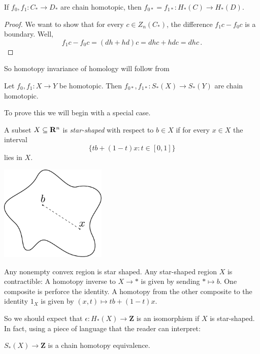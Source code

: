 \begin{lemma}
If $f_0,f_1:C_\ast\to D_\ast$ are chain homotopic, then 
$f_{0\ast}=f_{1\ast}: H_\ast(C)\to H_\ast(D)$.
	\end{lemma}
		\begin{proof}
We want to show that for every $c\in Z_n(C_\ast)$, the difference 
$f_1c-f_0c$ is a boundary. Well, 
\[
f_1c-f_0c=(d h+hd)c=d hc+hd c=dhc\,.
\]
		\end{proof}

So homotopy invariance of homology will follow from
\begin{prop}
Let $f_0,f_1:X\to Y$ be homotopic. Then $f_{0*},f_{1*}:S_\ast(X)\to S_\ast(Y)$ are chain homotopic.
\end{prop}

To prove this we will begin with a special case. 
\begin{definition}
A subset $X\subseteq\mathbf R^n$ is {\em star-shaped} with respect to $b\in X$ if
for every $x\in X$ the interval 
\[
\{tb+(1-t)x:t\in[0,1]\}
\]
lies in $X$. 
\end{definition}

\begin{center}
\includegraphics[width=2in]{905/Figures/05-star-shaped.pdf}
\end{center}

Any nonempty convex region is star shaped.
Any star-shaped region $X$ is contractible: A homotopy 
inverse to $X\to\ast$ is given by sending $\ast\mapsto b$. One composite is
perforce the identity. A homotopy from the other composite to the identity
$1_X$ is given by $(x,t)\mapsto tb+(1-t)x$.

So we should expect that $\epsilon:H_*(X)\to\mathbf{Z}$ is an isomorphism 
if $X$ is star-shaped. In fact, using a piece of language that the reader
can interpret:
\begin{prop}
$S_*(X)\to\mathbf{Z}$ is a chain homotopy equivalence.
\end{prop}


